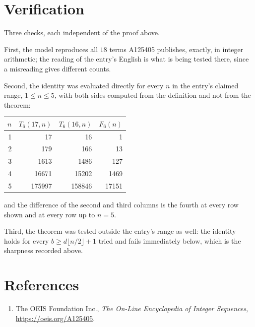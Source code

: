 \documentclass[11pt,a4paper]{article}
\theoremstyle{plain}
\theoremstyle{definition}
\begin{document}
\section{Verification}

Three checks, each independent of the proof above.

First, the model reproduces all $18$ terms A125405 publishes, exactly, in integer
arithmetic; the reading of the entry's English is what is being tested there, since a
misreading gives different counts.

Second, the identity was evaluated directly for every $n$ in the entry's claimed range,
$1\le n\le5$, with both sides computed from the definition and not from the theorem:

\begin{center}
\begin{tabular}{rrrr}
$n$ & $T_{6}(17,n)$ & $T_{6}(16,n)$ & $F_{6}(n)$ \\ \hline
1 & 17 & 16 & 1 \\
2 & 179 & 166 & 13 \\
3 & 1613 & 1486 & 127 \\
4 & 16671 & 15202 & 1469 \\
5 & 175997 & 158846 & 17151 \\
\end{tabular}
\end{center}

\noindent and the difference of the second and third columns is the fourth at every row shown
and at every row up to $n=5$.

Third, the theorem was tested outside the entry's range as well: the identity holds for every
$b\ge d\lfloor n/2\rfloor+1$ tried and fails immediately below, which is the sharpness recorded
above.

\section*{References}
\begin{enumerate}
\item The OEIS Foundation Inc., \emph{The On-Line Encyclopedia of Integer Sequences},
\url{https://oeis.org/A125405}.
\end{enumerate}
\end{document}
